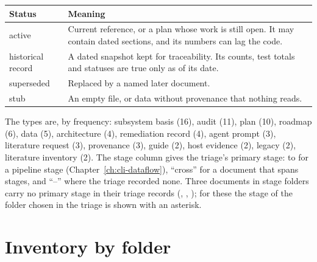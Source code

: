 {\small
\noindent\begin{tabularx}{\linewidth}{@{}P{3.0cm}Y@{}}
\toprule
Status & Meaning \\
\midrule
active & Current reference, or a plan whose work is still open. It may contain dated sections, and its numbers can lag the code. \\
historical record & A dated snapshot kept for traceability. Its counts, test totals and statuses are true only as of its date. \\
superseded & Replaced by a named later document. \\
stub & An empty file, or data without provenance that nothing reads. \\
\bottomrule
\end{tabularx}}

The types are, by frequency: subsystem basis (16), audit (11), plan (10), roadmap (6), data (5), architecture (4), remediation record (4), agent prompt (3), literature request (3), provenance (3), guide (2), host evidence (2), legacy (2), literature inventory (2). The stage column gives the triage's primary stage:  to  for a pipeline stage (Chapter~\ref{ch:cli-dataflow}), ``cross'' for a document that spans stages, and ``--'' where the triage recorded none. Three documents in stage folders carry no primary stage in their triage records (, , ); for these the stage of the folder chosen in the triage is shown with an asterisk.


\section{Inventory by folder}\label{sec:inv-table}

